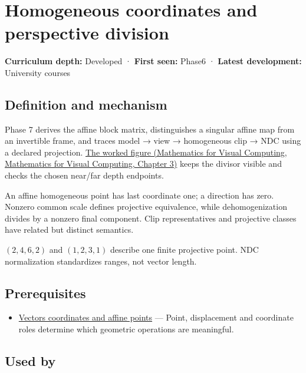 \hypertarget{appendix-cb3b26862282}{}\label{referencestart:appendix-cb3b26862282}
\section{Homogeneous coordinates and perspective division}\label{appendix-cb3b26862282-homogeneous-coordinates-and-perspective-division}

\textbf{Curriculum depth:} Developed · \textbf{First seen:} Phase6 · \textbf{Latest development:} University courses

\subsection{Definition and mechanism}\label{appendix-cb3b26862282-definition-and-mechanism}

Phase 7 derives the affine block matrix, distinguishes a singular affine map from an invertible frame, and traces model → view → homogeneous clip → NDC using a declared projection. \href{../02-Mathematics-for-Visual-Computing/main.pdf\#nameddest=01-foundations-i-ch019-figure-m6---follow-one-point-through-named-spaces}{The worked figure (Mathematics for Visual Computing, Mathematics for Visual Computing, Chapter 3)} keeps the divisor visible and checks the chosen near/far depth endpoints.

An affine homogeneous point has last coordinate one; a direction has zero. Nonzero common scale defines projective equivalence, while dehomogenization divides by a nonzero final component. Clip representatives and projective classes have related but distinct semantics.

\((2,4,6,2)\) and \((1,2,3,1)\) describe one finite projective point. NDC normalization standardizes ranges, not vector length.

\subsection{Prerequisites}\label{appendix-cb3b26862282-prerequisites}

\begin{itemize}
\tightlist
\item
  \hyperref[appendix-0659864c0aa3]{Vectors coordinates and affine points} --- Point, displacement and coordinate roles determine which geometric operations are meaningful.
\end{itemize}

\subsection{Used by}\label{appendix-cb3b26862282-used-by}

